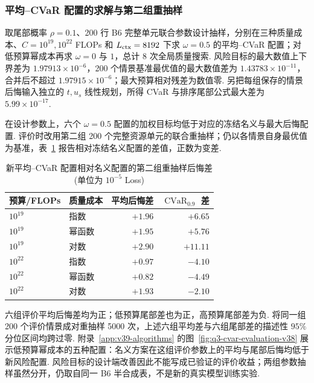 \subsubsection{平均--CVaR 配置的求解与第二组重抽样}\label{sec:q3-cvar-results-v38}
取尾部概率 $\rho=0.1$、200 行 B6 完整单元联合参数设计抽样，分别在三种质量成本、$C=10^{19},10^{22}$ FLOPs 和 $L_{\rm ctx}=8192$ 下求 $\omega=0.5$ 的平均--CVaR 配置；对低预算幂成本再求 $\omega=0$ 与 $1$，总计 8 次全局质量搜索. 风险目标的最大数值上下界差为 $1.97913\times10^{-6}$，200 个情景基准最优值的最大数值差为 $1.43783\times10^{-11}$，合并后不超过 $1.97915\times10^{-6}$；最大预算相对残差为数值零. 另把每组保存的情景后悔输入独立的 $t,u_s$ 线性规划，所得 CVaR 与排序尾部公式最大差为 $5.99\times10^{-17}$. %

在设计参数上，六个 $\omega=0.5$ 配置的加权目标均低于对应的冻结名义与最大后悔配置. 评价时改用第二组 200 个完整资源单元的联合重抽样；仍以各情景自身最优值为基准，表~\ref{tab:q3-cvar-evaluation-v38} 报告相对冻结名义配置的差值，正数为变差. 
\begin{table}[htbp]\centering\small
    \caption{新平均--CVaR 配置相对名义配置的第二组重抽样后悔差(单位为 $10^{-5}$ Loss)}\label{tab:q3-cvar-evaluation-v38}
    \begin{tabular}{llrr}\toprule
        预算/FLOPs  & 质量成本 & 平均后悔差   & $\operatorname{CVaR}_{0.9}$ 差 \\\midrule
        $10^{19}$ & 指数   & $+1.96$ & $+6.65$                       \\
        $10^{19}$ & 幂函数  & $+1.95$ & $+5.76$                       \\
        $10^{19}$ & 对数   & $+2.90$ & $+11.11$                      \\
        $10^{22}$ & 指数   & $+0.97$ & $-4.10$                       \\
        $10^{22}$ & 幂函数  & $+0.82$ & $-4.49$                       \\
        $10^{22}$ & 对数   & $+1.93$ & $-2.10$                       \\\bottomrule
    \end{tabular}
\end{table}
六组评价平均后悔差均为正；低预算尾部差也为正，高预算尾部差为负. 将同一组 200 个评价情景成对重抽样 5000 次，上述六组平均差与六组尾部差的描述性 $95\%$ 分位区间均跨过零. 附录~\ref{app:v39-algorithms} 的图~\ref{fig:q3-cvar-evaluation-v38} 展示低预算幂成本的五种配置：名义方案在这组评价参数上的平均与尾部后悔均低于新风险配置. 风险目标的设计端改善因此不能写成已验证的评价收益；两组参数抽样虽然分开，仍取自同一 B6 半合成表，不是新的真实模型训练实验. 



